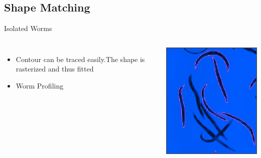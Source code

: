 \documentclass[xcolor=table]{beamer}
\begin{document}
\subsection{Shape Matching}
\begin{frame}{Isolated Worms}

\begin{columns}[c]
\column{2.4in}
\begin{itemize}
\item Contour can be traced easily.The shape is rasterized 
and thus fitted \pause
\item Worm Profiling 
\end{itemize}
\column{2.2in}
\includegraphics[scale=0.5]{iso}
\end{columns}

\end{frame}

\end{document}
